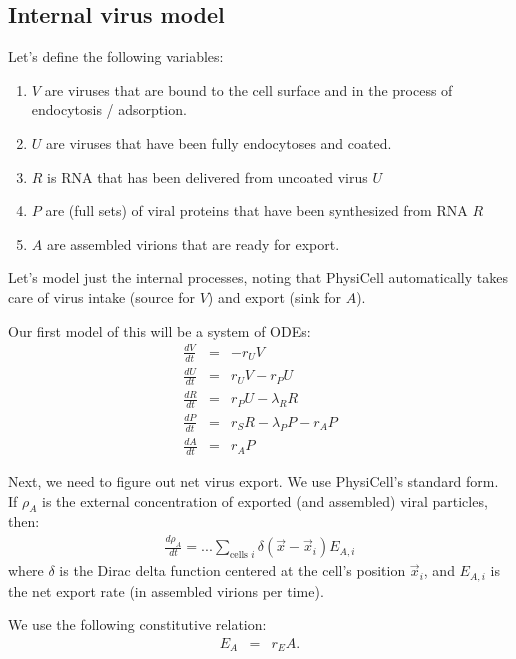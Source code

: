 \documentclass[12point]{article}
\begin{document}
\subsection{Internal virus model}
Let's define the following variables: 
\begin{enumerate}
\item 
$V$ are viruses that are bound to the cell surface and in the process of endocytosis / adsorption. 

\item 
$U$ are viruses that have been fully endocytoses and coated. 

\item 
$R$ is RNA that has been delivered from uncoated virus $U$

\item 
$P$ are (full sets) of viral proteins that have been synthesized from RNA $R$

\item 
$A$ are assembled virions that are ready for export. 

\end{enumerate}
Let's model just the internal processes, noting that PhysiCell automatically takes care of virus intake (source for $V$) and export (sink for $A$). 

Our first model of this will be a system of ODEs: 
\begin{eqnarray}
\frac{dV}{dt} & = & -r_U V \\
\frac{dU}{dt} & = & r_U V - r_P U \\
\frac{dR}{dt} & = & r_P U - \lambda_R R \\
\frac{dP}{dt} & = & r_S R - \lambda_P P - r_A P \\
\frac{dA}{dt} & = & r_A P
\end{eqnarray}

Next, we need to figure out net virus export. We use PhysiCell's standard form. If $\rho_A$ is the external concentration of exported (and assembled) viral particles, then: 
\begin{eqnarray}
\frac{d\rho_A}{dt} = ... \sum_{\textrm{cells } i} \delta( \vec{x}-\vec{x}_i ) E_{A,i}
\end{eqnarray}
where $\delta$ is the Dirac delta function centered at the cell's position
$\vec{x}_i$, and $E_{A,i}$ is the net export rate (in assembled virions per time). 

We use the following constitutive relation: 
\begin{eqnarray}
E_A & = & r_E A. 
\end{eqnarray}
\end{document}
